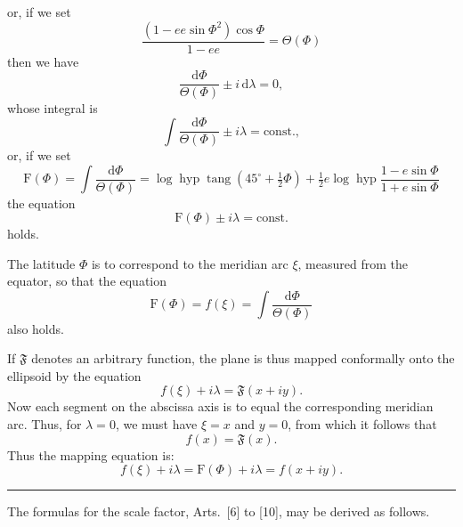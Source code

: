 {\small
\noindent or, if we set
\begin{equation*}
\frac{(1-ee\sin\Phi^2)\cos\Phi}{1-ee}=\Theta(\Phi)
\tag*{1)}
\end{equation*}
\noindent then we have
\[
\frac{\mathrm d\Phi}{\Theta(\Phi)}\pm i\,\mathrm d\lambda=0,
\]
\noindent whose integral is
\[
\int\frac{\mathrm d\Phi}{\Theta(\Phi)}\pm i\lambda=\mathrm{const.},
\]
\noindent or, if we set
\begin{equation*}
\mathrm F(\Phi)=\int\frac{\mathrm d\Phi}{\Theta(\Phi)}
=\log\operatorname{hyp}\operatorname{tang}(45^\circ+\tfrac12\Phi)
+\tfrac12 e\log\operatorname{hyp}\frac{1-e\sin\Phi}{1+e\sin\Phi}
\tag*{2)}
\end{equation*}
\noindent the equation
\[
\mathrm F(\Phi)\pm i\lambda=\mathrm{const.}
\]
\noindent holds.

The latitude \(\Phi\) is to correspond to the meridian arc \(\xi\), measured from the
equator, so that the equation
\begin{equation*}
\mathrm F(\Phi)=f(\xi)=\int\frac{\mathrm d\Phi}{\Theta(\Phi)}
\tag*{3)}
\end{equation*}
\noindent also holds.

If \(\mathfrak F\) denotes an arbitrary function, the plane is thus mapped
conformally onto the ellipsoid by the equation
\[
f(\xi)+i\lambda=\mathfrak F(x+iy).
\]
Now each segment on the abscissa axis is to equal the corresponding meridian arc.
Thus, for \(\lambda=0\), we must have \(\xi=x\) and \(y=0\), from which it follows that
\[
f(x)=\mathfrak F(x).
\]
\noindent Thus the mapping equation is:
\begin{equation*}
f(\xi)+i\lambda=\mathrm F(\Phi)+i\lambda=f(x+iy).
\tag*{4)}
\end{equation*}
\begin{center}\rule{.24\linewidth}{.4pt}\end{center}

The formulas for the scale factor, Arts.\ [6] to [10], may be derived as follows.

}

